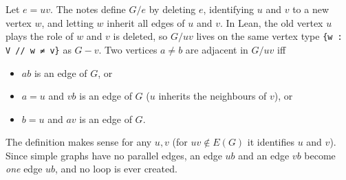 \documentclass[11pt,a4paper]{article}
\newcommand{\lean}[1]{\texttt{\textcolor{leanink}{#1}}}
\begin{document}
Let $e = uv$. The notes define $G / e$ by deleting $e$, identifying $u$ and $v$ to a new vertex
$w$, and letting $w$ inherit all edges of $u$ and $v$. In Lean, the old vertex $u$ plays the
role of $w$ and $v$ is deleted, so $G / uv$ lives on the same vertex type
\lean{\{w : V // w ≠ v\}} as $G - v$. Two vertices $a \ne b$ are adjacent in $G / uv$ iff
\begin{itemize}
\item $ab$ is an edge of $G$, or
\item $a = u$ and $vb$ is an edge of $G$ ($u$ inherits the neighbours of $v$), or
\item $b = u$ and $av$ is an edge of $G$.
\end{itemize}
The definition makes sense for any $u, v$ (for $uv \notin E(G)$ it identifies $u$ and $v$). Since
simple graphs have no parallel edges, an edge $ub$ and an edge $vb$ become \emph{one} edge $ub$,
and no loop is ever created.
\end{document}

